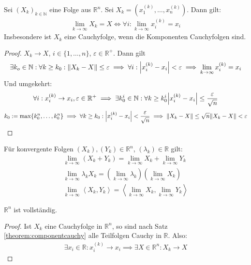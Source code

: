 \documentclass{report}
\renewcommand\epsilon{\varepsilon}
\newcommand{\bN}{\mathbb{N}}
\newcommand{\bR}{\mathbb{R}}
\newcommand{\scalar}[2]{\left\langle #1, #2 \right\rangle}
\begin{document}
\begin{theorem}
\label{theorem:componentcauchy}
 Sei $(X_k)_{k \in \bN}$ eine Folge aus $\bR^n$. Sei $X_k = (x_1^{(k)}, \hdots, x_n^{(k)})$. Dann gilt:
 \begin{align*}
  \lim_{k \to \infty} X_k = X \Leftrightarrow \forall i : \lim_{k \to \infty} x_i^{(k)} = x_i
 \end{align*}
 Insbesondere ist $X_k$ eine Cauchyfolge, wenn die Komponenten Cauchyfolgen sind.
\end{theorem}
\begin{proof}
 $X_k \to X$, $i \in \{1, \hdots, n\}$, $\epsilon \in \bR^+$. Dann gilt
 \begin{align*}
  \exists k_o \in \bN : \forall k \geq k_0 : \norm{X_k - X} \leq \epsilon \implies \forall i : \abs{x_i^{(k)} - x_i} < \epsilon \implies \lim_{k \to \infty} x_i^{(k)} = x_i
 \end{align*}
 Und umgekehrt:
 \begin{align*}
  \forall i : x_i^{(k)} \to x_i, \epsilon \in \bR^+ \implies \exists k_0^i \in \bN : \forall k \geq k_0^i \abs{x_i^{(k)} - x_i} \leq \frac{\epsilon}{\sqrt{n}}
 \end{align*}
 \[
  k_0 := \max\{k_0^n, \hdots, k_0^n\} \implies \forall k \geq k_0 : \abs{x_i^{(k)} - x_i} < \frac{\epsilon}{\sqrt{n}} \implies \norm{X_k - X} \leq \sqrt{n}\norm{X_k - X} < \epsilon
 \]
\end{proof}
\begin{theorem}
 Für konvergente Folgen $(X_k),(Y_k) \in \bR^n$, $(\lambda_k) \in \bR$ gilt:
\begin{align}
 \lim_{k \to \infty} (X_k + Y_k) = \lim_{k \to \infty} X_k + \lim_{k \to \infty} Y_k\\
 \lim_{k \to \infty} \lambda_k X_k = \left(\lim_{k \to \infty} \lambda_k\right)\left(\lim_{k \to \infty}
 X_k\right)\\
 \lim_{k \to \infty} \scalar{X_k}{Y_k} = \scalar{\lim_{k \to \infty} X_k}{\lim_{k \to \infty} Y_k}
\end{align}
\end{theorem}
\begin{theorem}
 $\bR^n$ ist vollständig.
\end{theorem}
\begin{proof}
Ist $X_k$ eine Cauchyfolge in $\bR^n$, so sind nach Satz \ref{theorem:componentcauchy} alle Teilfolgen Cauchy in $\bR$. Also:
\begin{align*}
 \exists x_i \in \bR : x_i^{(k)} \to x_i \implies \exists X \in \bR^n : X_k \to X
\end{align*}
\end{proof}
\end{document}
